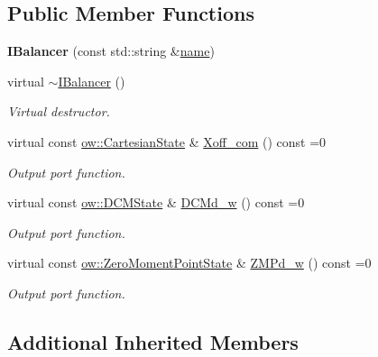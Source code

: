 \subsection*{Public Member Functions}
\begin{DoxyCompactItemize}
\item 
{\bfseries I\+Balancer} (const std\+::string \&\hyperlink{classow_1_1GenericModuleBase_a4b712883728cdbab7779e27f9a23689c}{name})\hypertarget{classow_1_1IBalancer_a1a0b556aaa2066e898ad6794aa810b4d}{}\label{classow_1_1IBalancer_a1a0b556aaa2066e898ad6794aa810b4d}

\item 
virtual \hyperlink{classow_1_1IBalancer_aa708682dd0caf0488bb7fd8e7b732c22}{$\sim$\+I\+Balancer} ()\hypertarget{classow_1_1IBalancer_aa708682dd0caf0488bb7fd8e7b732c22}{}\label{classow_1_1IBalancer_aa708682dd0caf0488bb7fd8e7b732c22}

\begin{DoxyCompactList}\small\item\em Virtual destructor. \end{DoxyCompactList}\item 
virtual const \hyperlink{classow__core_1_1CartesianState}{ow\+::\+Cartesian\+State} \& \hyperlink{classow_1_1IBalancer_a00656435faab973f7c5617aa3c318d51}{Xoff\+\_\+com} () const =0
\begin{DoxyCompactList}\small\item\em Output port function. \end{DoxyCompactList}\item 
virtual const \hyperlink{classow__core_1_1DivergentComponentOfMotionState}{ow\+::\+D\+C\+M\+State} \& \hyperlink{classow_1_1IBalancer_a4db08ea933f73841929abd5daba8be8f}{D\+C\+Md\+\_\+w} () const =0
\begin{DoxyCompactList}\small\item\em Output port function. \end{DoxyCompactList}\item 
virtual const \hyperlink{classow__core_1_1ZeroMomentPointState}{ow\+::\+Zero\+Moment\+Point\+State} \& \hyperlink{classow_1_1IBalancer_a7867ad2c24f117fa80d5cbf5074686ee}{Z\+M\+Pd\+\_\+w} () const =0
\begin{DoxyCompactList}\small\item\em Output port function. \end{DoxyCompactList}\end{DoxyCompactItemize}
\subsection*{Additional Inherited Members}


